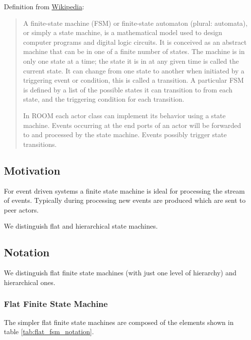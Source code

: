 Definition from \href{http://en.wikipedia.org/wiki/Finite-state\_machine}{Wikipedia}:

\begin{quote}
A finite-state machine (FSM) or finite-state automaton (plural: automata), or simply a state machine, is a 
mathematical model used to design computer programs and digital logic circuits. It is conceived as an 
abstract machine that can be in one of a finite number of states. The machine is in only one state at a 
time; the state it is in at any given time is called the current state. It can change from one state to 
another when initiated by a triggering event or condition, this is called a transition. A particular FSM 
is defined by a list of the possible states it can transition to from each state, and the triggering 
condition for each transition.

In ROOM each actor class can implement its behavior using a state machine. Events occurring at the end 
ports of an actor will be forwarded to and processed by the state machine. Events possibly trigger state 
transitions.
\end{quote}

\subsection{Motivation}

For event driven systems a finite state machine is ideal for processing the stream of events. Typically 
during processing new events are produced which are sent to peer actors.

We distinguish flat and hierarchical state machines.

\subsection{Notation}

We distinguish flat finite state machines (with just one level of hierarchy) and hierarchical ones.

\subsubsection{Flat Finite State Machine}

The simpler flat finite state machines are composed of the elements shown in table \ref{tab:flat_fsm_notation}.

